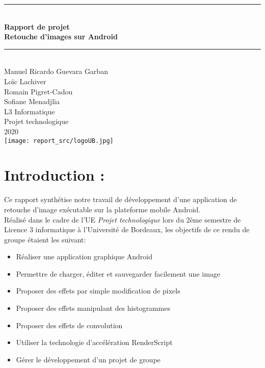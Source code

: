 \documentclass[12pt, a4paper]{article}
\begin{document}
\begin{titlepage}
  \begin{center}

    \rule{\linewidth}{0.5mm} \\[0.4cm]
    { \huge \bfseries {\LARGE{Rapport de projet}}
    \\Retouche d'images sur Android\\[0.4cm] }
    \rule{\linewidth}{0.5mm} \\[1.5cm]
    
    {\Large {
      Manuel Ricardo Guevara Garban\\
      Loïc Lachiver\\
      Romain Pigret-Cadou\\
      Sofiane Menadjlia
    }}\\[1.5cm]
    {\LARGE L3 Informatique}\\[0.5cm]
    
    {\Large Projet technologique}\\[0.5cm]
    {\Large 2020}\\[1.5cm]
    
    \texttt{[image: report\_src/logoUB.jpg]}
    
    
  \end{center}
\end{titlepage}



\tableofcontents
\clearpage 


\section{Introduction :} \label{intro}
Ce rapport synthétise notre travail de développement d'une application de retouche d'image exécutable sur la plateforme mobile Android.
\\
Réalisé dans le cadre de l'UE \textit{Projet technologique} lors du 2ème semestre de Licence 3 informatique à l'Université de Bordeaux, les objectifs de ce rendu de groupe étaient les suivant:
\begin{itemize} [label=\textbullet]
  \item Réaliser une application graphique Android
  \item Permettre de charger, éditer et sauvegarder facilement une image
  \item Proposer des effets par simple modification de pixels
  \item Proposer des effets manipulant des histogrammes
  \item Proposer des effets de convolution
  \item Utiliser la technologie d'accélération RenderScript
  \item Gérer le développement d'un projet de groupe
\end{itemize}
\end{document}

